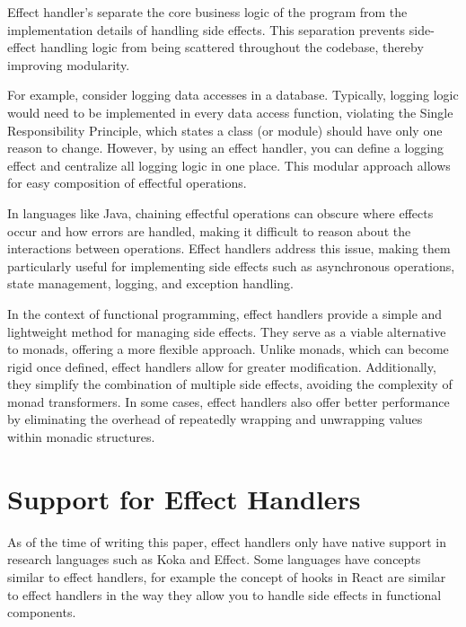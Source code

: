\documentclass[logo,bsc,singlespacing,parskip]{infthesis}
\begin{document}
Effect handler’s separate the core business logic of the program from the implementation details of handling side effects. This separation prevents side-effect handling logic from being scattered throughout the codebase, thereby improving modularity. 

For example, consider logging data accesses in a database. Typically, logging logic would need to be implemented in every data access function, violating the Single Responsibility Principle, which states a class (or module) should have only one reason to change. However, by using an effect handler, you can define a logging effect and centralize all logging logic in one place. This modular approach allows for easy composition of effectful operations. 

In languages like Java, chaining effectful operations can obscure where effects occur and how errors are handled, making it difficult to reason about the interactions between operations. Effect handlers address this issue, making them particularly useful for implementing side effects such as asynchronous operations, state management, logging, and exception handling. 

In the context of functional programming, effect handlers provide a simple and lightweight method for managing side effects. They serve as a viable alternative to monads, offering a more flexible approach. Unlike monads, which can become rigid once defined, effect handlers allow for greater modification. Additionally, they simplify the combination of multiple side effects, avoiding the complexity of monad transformers. In some cases, effect handlers also offer better performance by eliminating the overhead of repeatedly wrapping and unwrapping values within monadic structures. 

\section{Support for Effect Handlers}

As of the time of writing this paper, effect handlers only have native support in research languages such as Koka and Effect. Some languages have concepts similar to effect handlers, for example the concept of hooks in React are similar to effect handlers in the way they allow you to handle side effects in functional components. 
\end{document}
